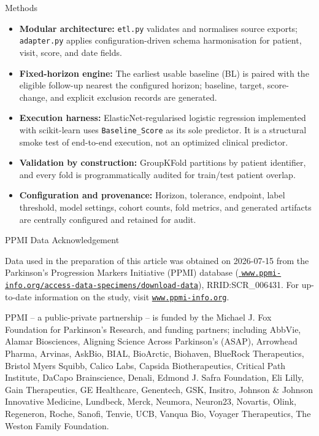 \begin{frame}[t]
\begin{columns}[t]
\begin{column}{\colwidth}
\begin{block}{Methods}
\begin{itemize}
  \setlength{\itemsep}{0.35em}
  \item \textbf{Modular architecture:} \texttt{etl.py} validates and normalises source exports; \texttt{adapter.py} applies configuration-driven schema harmonisation for patient, visit, score, and date fields.
  \item \textbf{Fixed-horizon engine:} The earliest usable baseline (BL) is paired with the eligible follow-up nearest the configured horizon; baseline, target, score-change, and explicit exclusion records are generated.
  \item \textbf{Execution harness:} ElasticNet-regularised logistic regression implemented with scikit-learn \citep{pedregosa2011} uses \texttt{Baseline\_Score} as its sole predictor. It is a structural smoke test of end-to-end execution, not an optimized clinical predictor.
  \item \textbf{Validation by construction:} GroupKFold partitions by patient identifier, and every fold is programmatically audited for train/test patient overlap.
  \item \textbf{Configuration and provenance:} Horizon, tolerance, endpoint, label threshold, model settings, cohort counts, fold metrics, and generated artifacts are centrally configured and retained for audit.
\end{itemize}
\end{block}

\vspace{1cm}

\begin{block}{PPMI Data Acknowledgement}
{\fontsize{13.5}{17}\selectfont
Data used in the preparation of this article was obtained on 2026-07-15 from
the Parkinson's Progression Markers Initiative (PPMI) database
(\href{https://www.ppmi-info.org/access-data-specimens/download-data}{%
\nolinkurl{www.ppmi-info.org/access-data-specimens/download-data}}),
RRID:SCR\_006431. For up-to-date information on the study, visit
\href{https://www.ppmi-info.org}{\nolinkurl{www.ppmi-info.org}}.

\vspace{0.35cm}

PPMI -- a public-private partnership -- is funded by the Michael J. Fox
Foundation for Parkinson's Research, and funding partners; including AbbVie,
Alamar Biosciences, Aligning Science Across Parkinson's (ASAP), Arrowhead
Pharma, Arvinas, AskBio, BIAL, BioArctic, Biohaven, BlueRock Therapeutics,
Bristol Myers Squibb, Calico Labs, Capsida Biotherapeutics, Critical Path
Institute, DaCapo Brainscience, Denali, Edmond J. Safra Foundation, Eli Lilly,
Gain Therapeutics, GE Healthcare, Genentech, GSK, Insitro, Johnson \& Johnson
Innovative Medicine, Lundbeck, Merck, Neumora, Neuron23, Novartis, Olink,
Regeneron, Roche, Sanofi, Tenvie, UCB, Vanqua Bio, Voyager Therapeutics, The
Weston Family Foundation.
}
\end{block}


\end{column}
\end{columns}
\end{frame}
